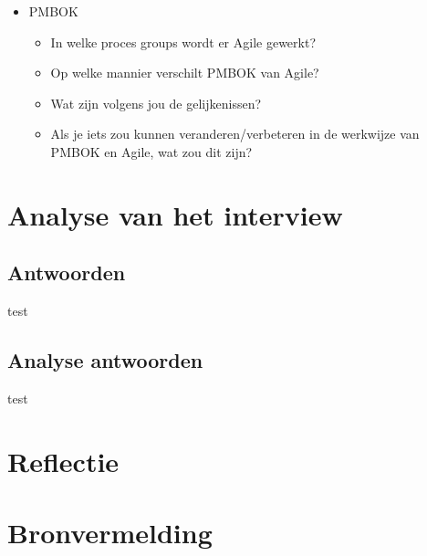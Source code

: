 \documentclass[]{article}
\begin{document}
\begin{itemize}
	\item PMBOK
	\begin{itemize}
		\item In welke proces groups wordt er Agile gewerkt?
		\item Op welke mannier verschilt PMBOK van Agile?
		\item Wat zijn volgens jou de gelijkenissen?
		\item Als je iets zou kunnen veranderen/verbeteren in de werkwijze van PMBOK en Agile, wat zou dit zijn?
	\end{itemize}
		
\end{itemize}

\section{Analyse van het interview}

\subsection{Antwoorden}
test
\subsection{Analyse antwoorden}
test

\section{Reflectie}

\section{Bronvermelding}
\printbibliography
\end{document}
